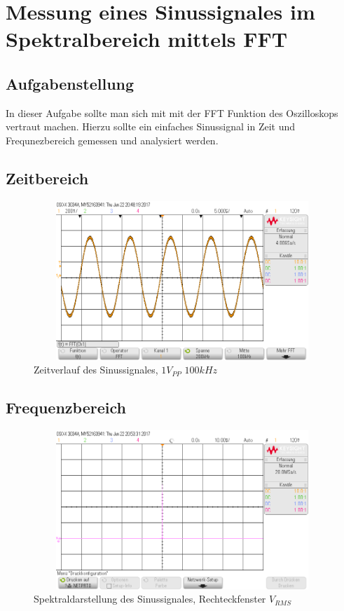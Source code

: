\section{Messung eines Sinussignales im Spektralbereich mittels FFT}

\subsection{Aufgabenstellung}
In dieser Aufgabe sollte man sich mit mit der FFT Funktion des Oszilloskops vertraut machen. Hierzu sollte ein einfaches Sinussignal in Zeit und Frequnezbereich gemessen und analysiert werden.

\subsection{Zeitbereich}

\begin{figure}[H]
 \begin{center}
  \includegraphics[height=6cm,width=12cm]{OsziBilder/bsp1_time}
 \end{center}
 \caption{Zeitverlauf des Sinussignales, $1V_{PP}$ $100kHz$}
\end{figure}

\subsection{Frequenzbereich}

\begin{figure}[H]
 \begin{center}
  \includegraphics[height=6cm,width=12cm]{OsziBilder/bsp1_Rechteck_RMS}
 \end{center}
 \caption{Spektraldarstellung des Sinussignales, Rechteckfenster $V_{RMS}$}
\end{figure}

